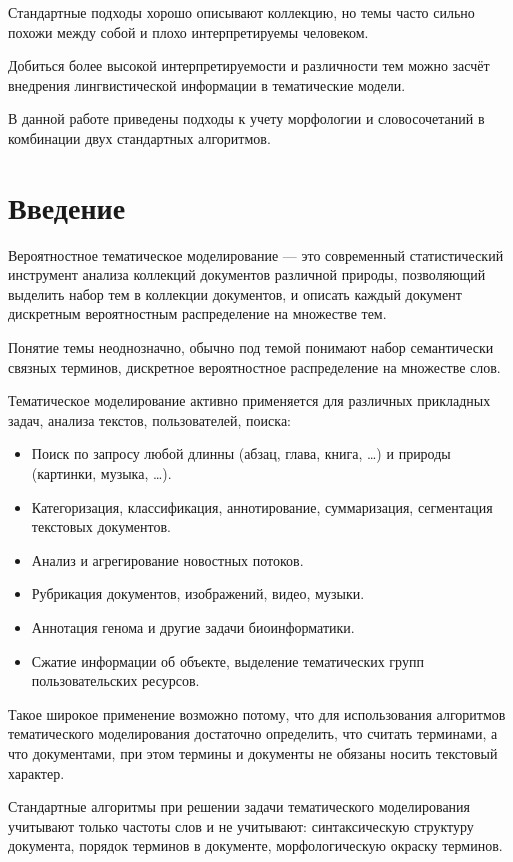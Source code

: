 \documentclass[a4paper, 14pt]{extarticle}
\begin{document}
Стандартные подходы хорошо описывают коллекцию, но темы часто сильно похожи между собой и плохо интерпретируемы человеком.

Добиться более высокой интерпретируемости и различности тем можно засчёт внедрения лингвистической информации в тематические модели.

В данной работе приведены подходы к учету морфологии и словосочетаний в комбинации двух стандартных алгоритмов.  
\newpage
\section*{Введение}
Вероятностное тематическое моделирование --- это современный  статистический инструмент анализа коллекций документов различной природы, позволяющий выделить набор тем в коллекции документов, и описать каждый документ дискретным вероятностным распределение на множестве тем.

Понятие темы неоднозначно, обычно под темой понимают набор семантически связных терминов, дискретное вероятностное распределение на множестве слов. 

Тематическое моделирование активно применяется для различных прикладных задач, анализа текстов, пользователей, поиска:   

\begin{itemize}
	\item Поиск по запросу любой длинны (абзац, глава, книга, \dots) и природы (картинки, музыка, \dots).
	\item Категоризация, классификация, аннотирование, суммаризация, сегментация текстовых документов.
	\item Анализ и агрегирование новостных потоков.
	\item Рубрикация документов, изображений, видео, музыки.
	\item Аннотация генома и другие задачи биоинформатики.
	\item Сжатие информации об объекте, выделение тематических групп пользовательских ресурсов.
\end{itemize}
Такое широкое применение возможно потому, что для использования алгоритмов тематического моделирования достаточно определить, что считать терминами, а что документами, при этом термины и документы не обязаны носить текстовый характер.

Стандартные алгоритмы при решении задачи тематического моделирования учитывают только частоты слов и не учитывают: синтаксическую структуру документа, порядок терминов в документе, морфологическую окраску терминов. 
\end{document}
